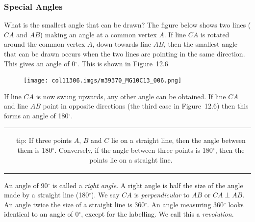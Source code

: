             \subsubsection{ Special Angles}
            \nopagebreak
        \label{m39370*id314513}What is the smallest angle that can be drawn? The figure below shows two lines ($CA$ and $AB$) making an angle at a common vertex $A$. If line $CA$ is rotated around the common vertex $A$, down towards line $AB$, then the smallest angle that can be drawn occurs when the two lines are pointing in the same direction. This gives an angle of 0${}^{\circ }$. This is shown in Figure~12.6\par 
        \label{m39370*id314590}
    \setcounter{subfigure}{0}
	\begin{figure}[H] %
    \begin{center}
    \label{m39370*id314593!!!underscore!!!media}\label{m39370*id314593!!!underscore!!!printimage}\texttt{[image: col11306.imgs/m39370\_MG10C13\_006.png]} %
      \vspace{2pt}
    \vspace{.1in}
    \end{center}
 \end{figure}       
        \par 
        \label{m39370*id314599}If line $CA$ is now swung upwards, any other angle can be obtained. If line $CA$ and line $AB$ point in opposite directions (the third case in Figure~12.6) then this forms an angle of 180${}^{\circ }$.\par 
\label{m39370*notfhsst!!!underscore!!!id201}
\begin{tabular}{cc}
	   \hspace*{-50pt}\raisebox{-8 mm}{ \texttt{[image: col11306.imgs/pstip2.png]}  }& 
	\begin{minipage}{0.85\textwidth}
	\begin{note}
      {tip: }If three points $A$, $B$ and $C$ lie on a straight line, then the angle between them is 180${}^{\circ }$. Conversely, if the angle between three points is 180${}^{\circ }$, then the points lie on a straight line.
	\end{note}
	\end{minipage}
	\end{tabular}
	\par
        \label{m39370*id314704}An angle of 90${}^{\circ }$ is called a \textsl{right angle}. A right angle is half the size of the angle made by a straight line (180${}^{\circ }$). We say $CA$ is \textsl{perpendicular} to $AB$ or $CA\perp AB$\hspace{1ex}. An angle twice the size of a straight line is 360${}^{\circ }$. An angle measuring 360${}^{\circ }$ looks identical to an angle of 0${}^{\circ }$, except for the labelling. We call this a \textsl{revolution}.\par 
